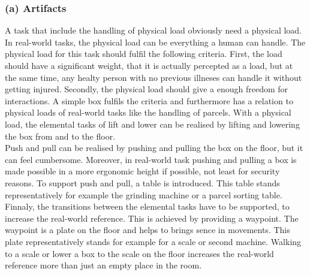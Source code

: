 \subsubsection{(a) Artifacts}
A task that include the handling of physical load obviously need a physical load. In real-world tasks, the physical load can be everything a human can handle. The physical load for this task should fulfil the following criteria. First, the load should have a significant weight, that it is actually percepted as a load, but at the same time, any healty person with no previous illneses can handle it without getting injured. Secondly, the physical load should give a enough freedom for interactions. A simple box fulfils the criteria and furthermore has a relation to physical loads of real-world tasks like the handling of parcels. With a physical load, the elemental tasks of lift and lower can be realised by lifting and lowering the box from and to the floor.\\
Push and pull can be realised by pushing and pulling the box on the floor, but it can feel cumbersome. Moreover, in real-world task pushing and pulling a box is made possible in a more ergonomic height if possible, not least for security reasons. To support push and pull, a table is introduced. This table stands representatively for example the grinding machine or a parcel sorting table.\\
Finnaly, the transitions between the elemental tasks have to be supported, to increase the real-world reference. This is achieved by providing a waypoint. The waypoint is a plate on the floor and helps to brings sence in movements. This plate representatively stands for example for a scale or second machine. Walking to a scale or lower a box to the scale on the floor increases the real-world reference more than just an empty place in the room.


